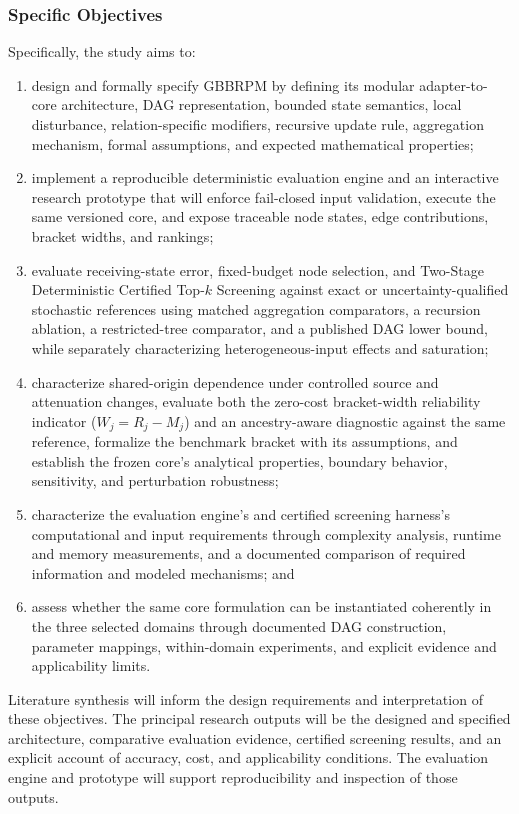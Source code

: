 \subsubsection{Specific Objectives}\label{specific-objectives}

Specifically, the study aims to:
\begin{enumerate}[label=\arabic*.,leftmargin=*]
\item design and formally specify GBBRPM by defining its modular
adapter-to-core architecture, DAG representation, bounded state semantics,
local disturbance, relation-specific modifiers, recursive update rule,
aggregation mechanism, formal assumptions, and expected mathematical
properties;
\item implement a reproducible deterministic evaluation engine and an
interactive research prototype that will enforce fail-closed input validation,
execute the same versioned core, and expose traceable node states, edge
contributions, bracket widths, and rankings;
\item evaluate receiving-state error, fixed-budget node selection, and
Two-Stage Deterministic Certified Top-$k$ Screening against exact or
uncertainty-qualified stochastic references using matched aggregation
comparators, a recursion ablation, a restricted-tree comparator, and a
published DAG lower bound, while separately characterizing
heterogeneous-input effects and saturation;
\item characterize shared-origin dependence under controlled source and
attenuation changes, evaluate both the zero-cost bracket-width reliability
indicator ($W_j = R_j - M_j$) and an ancestry-aware diagnostic against the
same reference, formalize the benchmark bracket with its assumptions, and
establish the frozen core's analytical properties, boundary behavior,
sensitivity, and perturbation robustness;
\item characterize the evaluation engine's and certified screening harness's
computational and input requirements through complexity analysis, runtime and
memory measurements, and a documented comparison of required information and
modeled mechanisms; and
\item assess whether the same core formulation can be instantiated
coherently in the three selected domains through documented DAG
construction, parameter mappings, within-domain experiments, and explicit
evidence and applicability limits.
\end{enumerate}

Literature synthesis will inform the design requirements and interpretation
of these objectives. The principal research outputs will be the designed and
specified architecture, comparative evaluation evidence, certified screening
results, and an explicit account of accuracy, cost, and applicability
conditions. The evaluation engine and prototype will support reproducibility
and inspection of those outputs.

